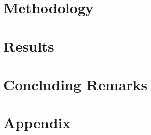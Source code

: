 \documentclass[a4paper,11pt]{article}
\begin{document}
\section{Methodology}

\section{Results}

\section{Concluding Remarks}

\clearpage
%


%
\clearpage
%
\appendix
\section{Appendix}

\renewcommand{\thesection}{A\arabic{section}}%
\renewcommand{\thetable}{A\arabic{table}}%
\renewcommand{\thefigure}{A\arabic{figure}}%
\renewcommand{\theequation}{A\arabic{eq}} 
\end{document}
